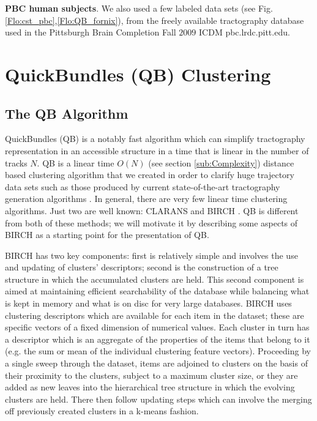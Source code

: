 \documentclass[preprint,authoryear,a4paper,10pt,onecolumn]{elsarticle}
\begin{document}
\textbf{PBC human subjects}. We also used a few labeled data sets (see
Fig.\ref{Flo:cst_pbc},\ref{Flo:QB_fornix}), from the freely available
tractography database used in the Pittsburgh Brain Completion Fall
$2009$ ICDM pbc.lrdc.pitt.edu.


\section{QuickBundles (QB) Clustering}

\subsection{The QB Algorithm}

QuickBundles (QB) is a notably fast algorithm which can simplify
tractography representation in an accessible structure in a time that is
linear in the number of tracks $N$. QB is a linear time $O(N)$ (see
section \ref{sub:Complexity}) distance based clustering algorithm that
we created in order to clarify huge trajectory data sets such as those
produced by current state-of-the-art tractography generation algorithms
\cite{Parker2003,WWS+08}. In general, there are very few linear time
clustering algorithms. Just two are well known: CLARANS
\cite{ng2002clarans} and BIRCH \cite{zhang1997birch}. QB is different
from both of these methods; we will motivate it by describing some
aspects of BIRCH as a starting point for the presentation of QB.

BIRCH has two key components: first is relatively simple and involves
the use and updating of clusters' descriptors; second is the
construction of a tree structure in which the accumulated clusters are
held. This second component is aimed at maintaining efficient
searchability of the database while balancing what is kept in memory and
what is on disc for very large databases. BIRCH uses clustering
descriptors which are available for each item in the dataset; these are
specific vectors of a fixed dimension of numerical values. Each cluster
in turn has a descriptor which is an aggregate of the properties of the
items that belong to it (e.g. the sum or mean of the individual
clustering feature vectors). Proceeding by a single sweep through the
dataset, items are adjoined to clusters on the basis of their proximity
to the clusters, subject to a maximum cluster size, or they are added as
new leaves into the hierarchical tree structure in which the evolving
clusters are held. There then follow updating steps which can involve
the merging off previously created clusters in a k-means
fashion\cite{steinhaus1956division,macqueen1967some}.
\end{document}
